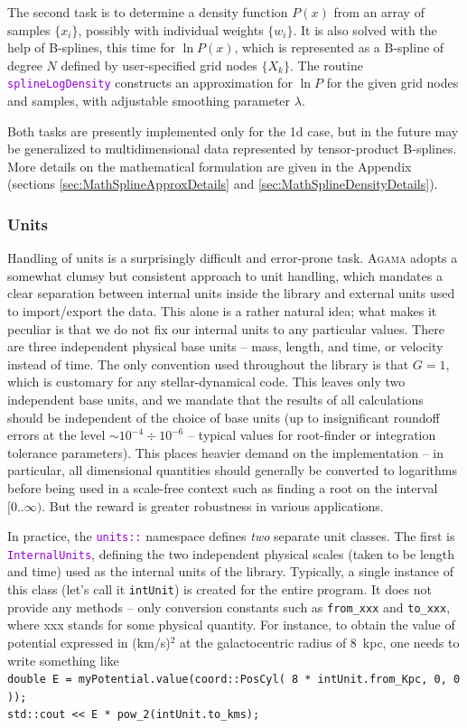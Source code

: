 \documentclass[12pt]{article}
\newcommand{\Agama}{\textsc{Agama}\xspace}
\newcommand{\ttt}[1]{\textcolor{darkviolet}{\texttt{#1}}}
\begin{document}
The second task is to determine a density function $P(x)$ from an array of samples $\{x_i\}$, possibly with individual weights $\{w_i\}$. It is also solved with the help of B-splines, this time for $\ln P(x)$, which is represented as a B-spline of degree $N$ defined by user-specified grid nodes $\{X_k\}$. The routine \ttt{splineLogDensity} constructs an approximation for $\ln P$ for the given grid nodes and samples, with adjustable smoothing parameter $\lambda$.

Both tasks are presently implemented only for the 1d case, but in the future may be generalized to multidimensional data represented by tensor-product B-splines. More details on the mathematical formulation are given in the Appendix (sections \ref{sec:MathSplineApproxDetails} and \ref{sec:MathSplineDensityDetails}).

\subsubsection{Units}  \label{sec:Units}

Handling of units is a surprisingly difficult and error-prone task. \Agama adopts a somewhat clumsy but consistent approach to unit handling, which mandates a clear separation between internal units inside the library and external units used to import/export the data. This alone is a rather natural idea; what makes it peculiar is that we do not fix our internal units to any particular values. There are three independent physical base units -- mass, length, and time, or velocity instead of time. The only convention used throughout the library is that $G=1$, which is customary for any stellar-dynamical code. This leaves only two independent base units, and we mandate that the results of all calculations should be independent of the choice of base units (up to insignificant roundoff errors at the level $\sim 10^{-4}\div 10^{-6}$ -- typical values for root-finder or integration tolerance parameters). This places heavier demand on the implementation -- in particular, all dimensional quantities should generally be converted to logarithms before being used in a scale-free context such as finding a root on the interval $[0..\infty)$. But the reward is greater robustness in various applications.

In practice, the \ttt{units::} namespace defines \textit{two} separate unit classes. The first is \ttt{InternalUnits}, defining the two independent physical scales (taken to be length and time) used as the internal units of the library. Typically, a single instance of this class (let's call it \texttt{intUnit}) is created for the entire program. It does not provide any methods -- only conversion constants such as \texttt{from_xxx} and \texttt{to_xxx}, where xxx stands for some physical quantity. For instance, to obtain the value of potential expressed in (km/s)${}^2$ at the galactocentric radius of 8~kpc, one needs to write something like \\
\texttt{double E = myPotential.value(coord::PosCyl( 8 * intUnit.from_Kpc, 0, 0 ));}\\
\texttt{std::cout << E * pow_2(intUnit.to_kms);}
\end{document}
